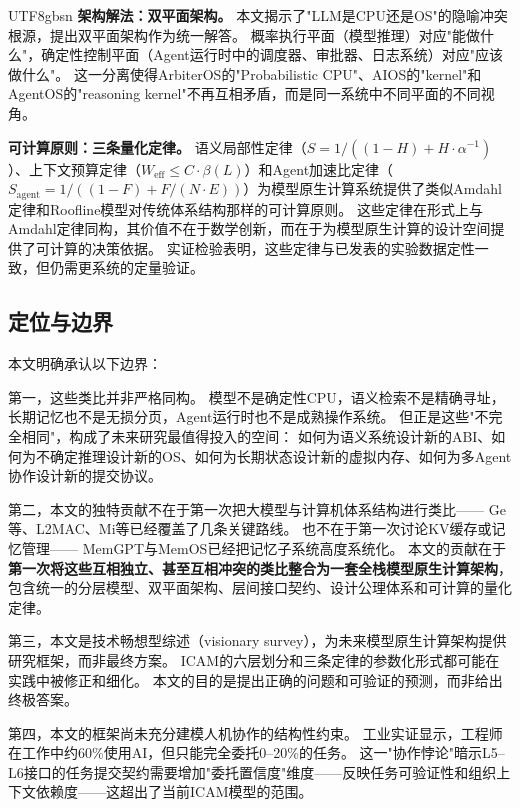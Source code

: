 \documentclass[11pt,a4paper]{article}
\begin{document}
\begin{CJK*}{UTF8}{gbsn}
\textbf{架构解法：双平面架构。}
本文揭示了"LLM是CPU还是OS"的隐喻冲突根源，提出双平面架构作为统一解答。
概率执行平面（模型推理）对应"能做什么"，确定性控制平面（Agent运行时中的调度器、审批器、日志系统）对应"应该做什么"。
这一分离使得ArbiterOS的"Probabilistic CPU"\cite{arbiteros2025}、AIOS的"kernel"\cite{mei2024aios}和AgentOS的"reasoning kernel"\cite{agentos2025}不再互相矛盾，而是同一系统中不同平面的不同视角。

\textbf{可计算原则：三条量化定律。}
语义局部性定律（$S = 1/((1-H)+H\cdot\alpha^{-1})$）、上下文预算定律（$W_{\mathrm{eff}} \leq C \cdot \beta(L)$）和Agent加速比定律（$S_{\mathrm{agent}} = 1/((1-F)+F/(N\cdot E))$）为模型原生计算系统提供了类似Amdahl定律和Roofline模型对传统体系结构那样的可计算原则。
这些定律在形式上与Amdahl定律同构，其价值不在于数学创新，而在于为模型原生计算的设计空间提供了可计算的决策依据。
实证检验表明，这些定律与已发表的实验数据定性一致，但仍需更系统的定量验证。

\subsection{定位与边界}

本文明确承认以下边界：

第一，这些类比并非严格同构。
模型不是确定性CPU，语义检索不是精确寻址，长期记忆也不是无损分页，Agent运行时也不是成熟操作系统。
但正是这些"不完全相同"，构成了未来研究最值得投入的空间：
如何为语义系统设计新的ABI、如何为不确定推理设计新的OS、如何为长期状态设计新的虚拟内存、如何为多Agent协作设计新的提交协议。

第二，本文的独特贡献不在于第一次把大模型与计算机体系结构进行类比——
Ge等\cite{ge2023llmos}、L2MAC\cite{holt2024l2mac}、Mi等\cite{mi2025llmagentscomputersystems}已经覆盖了几条关键路线。
也不在于第一次讨论KV缓存或记忆管理——
MemGPT\cite{memgpt2023}与MemOS\cite{memos2025}已经把记忆子系统高度系统化。
本文的贡献在于\textbf{第一次将这些互相独立、甚至互相冲突的类比整合为一套全栈模型原生计算架构}，包含统一的分层模型、双平面架构、层间接口契约、设计公理体系和可计算的量化定律。

第三，本文是技术畅想型综述（visionary survey），为未来模型原生计算架构提供研究框架，而非最终方案。
ICAM的六层划分和三条定律的参数化形式都可能在实践中被修正和细化。
本文的目的是提出正确的问题和可验证的预测，而非给出终极答案。

第四，本文的框架尚未充分建模人机协作的结构性约束。
工业实证显示，工程师在工作中约60\%使用AI，但只能完全委托0--20\%的任务\cite{anthropic2026agenticreport}。
这一"协作悖论"暗示L5--L6接口的任务提交契约需要增加"委托置信度"维度——反映任务可验证性和组织上下文依赖度——这超出了当前ICAM模型的范围。


\end{CJK*}
\end{document}
